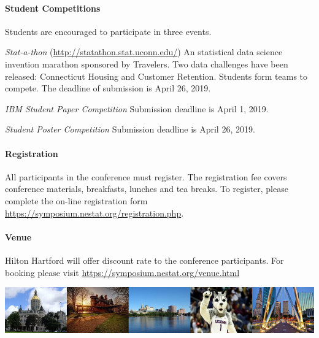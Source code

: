 \documentclass[12pt]{article}
\begin{document}
\paragraph{Student Competitions} Students are encouraged to participate in three events.

\emph{Stat-a-thon} (\url{http://statathon.stat.uconn.edu/})
An statistical data science invention marathon sponsored by Travelers. Two data challenges have been released: Connecticut Housing and Customer Retention. Students form teams to compete. The deadline of submission is April 26, 2019.

\emph{IBM Student Paper Competition} Submission deadline is April 1, 2019.

\emph{Student Poster Competition} Submission deadline is April 26, 2019.


\paragraph{Registration}
All participants in the conference must register. The registration fee covers conference materials, breakfasts, lunches and tea breaks. To register, please complete the on-line registration form  \url{https://symposium.nestat.org/registration.php}.

\paragraph{Venue}
Hilton Hartford will offer discount rate to the conference participants. For booking please visit \url{https://symposium.nestat.org/venue.html}


\vfill

\begin{center}
\includegraphics[width=\textwidth]{hartford-banner}
\end{center}
\end{document}

